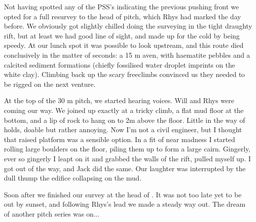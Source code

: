 Not having spotted any of the PSS's indicating the previous pushing front we opted for a full resurvey to the head of  pitch, which Rhys had marked the day before. We obviously got slightly chilled doing the surveying in the tight draughty rift, but at least we had good line of sight, and made up for the cold by being speedy. At our lunch spot it was possible to look upstream, and this route died conclusively in the matter of seconds: a 15 m aven, with haematite pebbles and a calcited sediment formations (chiefly fossilised water droplet imprints on the white clay). Climbing back up the scary freeclimbs convinced us they needed to be rigged on the next venture. 

At the top of the 30 m pitch, we started hearing voices. Will and Rhys were coming our way. We joined up exactly at a tricky climb, a flat mud floor at the bottom, and a lip of rock to hang on to 2m above the floor. Little in the way of holds, doable but rather annoying. Now I'm not a civil engineer, but I thought that raised platform was a sensible option. In a fit of near madness I started rolling large boulders on the floor, piling them up to form a large cairn. Gingerly, ever so gingerly I leapt on it and grabbed the walls of the rift, pulled myself up. I got out of the way, and Jack did the same. Our laughter was interrupted by the dull thump the edifice collapsing on the mud. 

Soon after we finished our survey at the head of . It was not too late yet to be out by sunset, and following Rhys's lead we made a steady way out. The dream of another pitch series was on...

